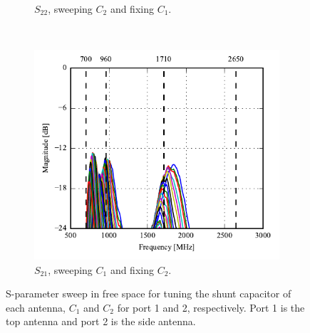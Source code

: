 \begin{figure}[htbp]
\begin{subfigure}[b]{0.49\linewidth}
        \caption{$S_{22}$, sweeping $C_2$ and fixing $C_1$.}
    \end{subfigure}
~
\center
    \begin{subfigure}[b]{0.49\linewidth}
        \centering
        \includegraphics{img/tech_sol/monopole/5mm/meas/S21.pdf}
        \caption{$S_{21}$, sweeping $C_1$ and fixing $C_2$.}
    \end{subfigure}
    \caption{S-parameter sweep in free space for tuning the shunt capacitor of each antenna, $C_1$ and $C_2$ for port 1 and 2, respectively. Port 1 is the top antenna and port 2 is the side antenna.}
    \label{fig:sparam_mono_mini_meas}
\end{figure}

